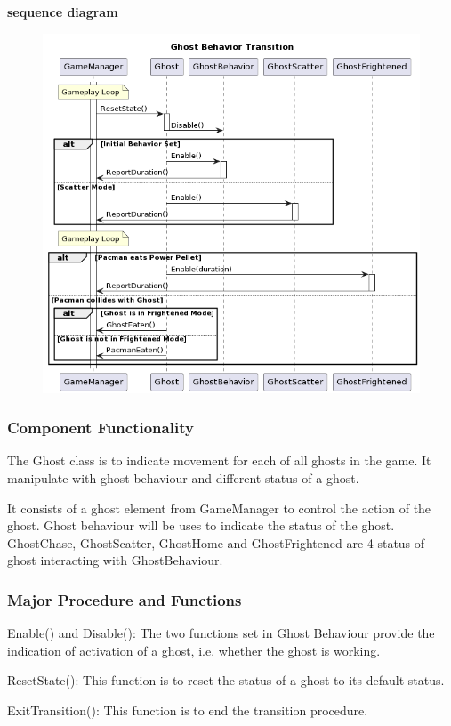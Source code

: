 \documentclass[11pt]{article}
\begin{document}
\textbf{sequence diagram}\\
\begin{figure}[H]
    \centering
    \includegraphics*[scale=0.4]{Ghost_Sequence.png}
\end{figure}
\subsubsection{Component Functionality}
The Ghost class is to indicate movement for each of all ghosts in the game. It manipulate with ghost behaviour and different status of a ghost.

It consists of a ghost element from GameManager to control the action of the ghost. Ghost behaviour will be uses to indicate the status of the ghost. GhostChase, GhostScatter, GhostHome and GhostFrightened are 4 status of ghost interacting with GhostBehaviour.
\subsubsection{Major Procedure and Functions}
Enable() and Disable(): The two functions set in Ghost Behaviour provide the indication of activation of a ghost, i.e. whether the ghost is working.

ResetState(): This function is to reset the status of a ghost to its default status.

ExitTransition(): This function is to end the transition procedure.
\end{document}
